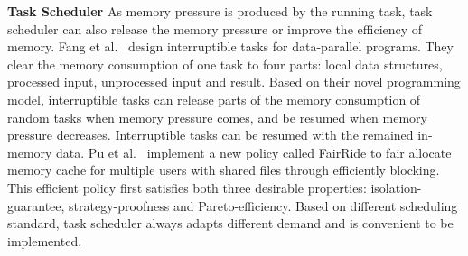 \textbf{Task Scheduler} As memory pressure is produced by the running task, task scheduler can also release the memory pressure or improve the efficiency of memory. Fang et al.~\cite{fang2015interruptible} design interruptible tasks for data-parallel programs. They clear the memory consumption of one task to four parts: local data structures, processed input, unprocessed input and result. Based on their novel programming model, interruptible tasks can release parts of the memory consumption of random tasks when memory pressure comes, and be resumed when memory pressure decreases. Interruptible tasks can be resumed with the remained in-memory data. Pu et al.~\cite{pu2016fairride} implement a new policy called FairRide to fair allocate memory cache for multiple users with shared files through efficiently blocking. This efficient policy first satisfies both three desirable properties: isolation-guarantee, strategy-proofness and Pareto-efficiency. Based on different scheduling standard, task scheduler always adapts different demand and is convenient to be implemented.
